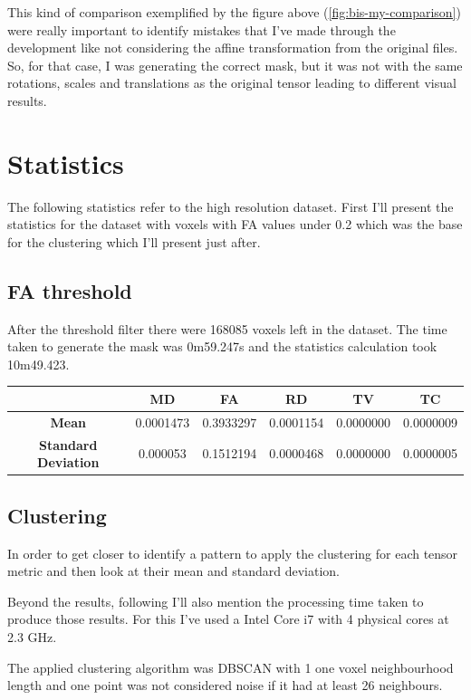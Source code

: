 \documentclass[a4paper,11pt]{report}
\begin{document}
  This kind of comparison exemplified by the figure above (\ref{fig:bis-my-comparison}) were really important to identify mistakes that I've made through the development like not considering the affine transformation from the original files. So, for that case, I was generating the correct mask, but it was not with the same rotations, scales and translations as the original tensor leading to different visual results.

  \section{Statistics}
  The following statistics refer to the high resolution dataset. First I'll present the statistics for the dataset with voxels with FA values under 0.2 which was the base for the clustering which I'll present just after.

    \subsection{FA threshold}
    After the threshold filter there were 168085 voxels left in the dataset. The time taken to generate the mask was 0m59.247s and the statistics calculation took 10m49.423.

    \begin{tabular}{| c | c | c | c | c | c |}
      \hline
        & \textbf{MD} & \textbf{FA} & \textbf{RD} & \textbf{TV} & \textbf{TC} \\ \hline
       \textbf{Mean} & 0.0001473 & 0.3933297 & 0.0001154 & 0.0000000 & 0.0000009 \\ \hline
       \textbf{Standard Deviation} & 0.000053 & 0.1512194 & 0.0000468 & 0.0000000 & 0.0000005 \\ \hline 
    \end{tabular}

    \subsection{Clustering}
    In order to get closer to identify a pattern to apply the clustering for each tensor metric and then look at their mean and standard deviation.

    Beyond the results, following I'll also mention the processing time taken to produce those results. For this I've used a Intel Core i7 with 4 physical cores at 2.3 GHz.

    The applied clustering algorithm was DBSCAN with 1 one voxel neighbourhood length and one point was not considered noise if it had at least 26 neighbours.
\end{document}
